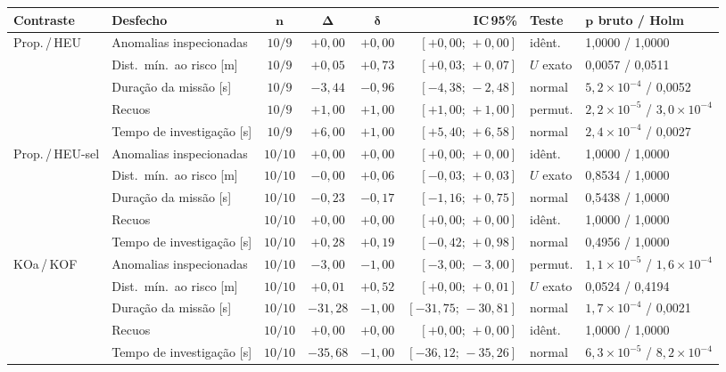 \begin{tabular}{llcccrll}
\hline
\textbf{Contraste} & \textbf{Desfecho} & $\bm{n}$ & $\bm{\Delta}$ & $\bm{\delta}$ & \textbf{IC\,95\%} & \textbf{Teste} & $\bm{p}$ \textbf{bruto / Holm}\\
\hline
Prop.\,/\,HEU & Anomalias inspecionadas & $10/9$ & $+0{,}00$ & $+0{,}00$ & $[+0{,}00;\,+0{,}00]$ & idênt. & 1{,}0000 / 1{,}0000\\
 & Dist.\ mín.\ ao risco [m] & $10/9$ & $+0{,}05$ & $+0{,}73$ & $[+0{,}03;\,+0{,}07]$ & $U$ exato & 0{,}0057 / 0{,}0511\\
 & Duração da missão [s] & $10/9$ & $-3{,}44$ & $-0{,}96$ & $[-4{,}38;\,-2{,}48]$ & normal & $5{,}2\times10^{-4}$ / 0{,}0052\\
 & Recuos & $10/9$ & $+1{,}00$ & $+1{,}00$ & $[+1{,}00;\,+1{,}00]$ & permut. & $2{,}2\times10^{-5}$ / $3{,}0\times10^{-4}$\\
 & Tempo de investigação [s] & $10/9$ & $+6{,}00$ & $+1{,}00$ & $[+5{,}40;\,+6{,}58]$ & normal & $2{,}4\times10^{-4}$ / 0{,}0027\\
\hline
Prop.\,/\,HEU-sel & Anomalias inspecionadas & $10/10$ & $+0{,}00$ & $+0{,}00$ & $[+0{,}00;\,+0{,}00]$ & idênt. & 1{,}0000 / 1{,}0000\\
 & Dist.\ mín.\ ao risco [m] & $10/10$ & $-0{,}00$ & $+0{,}06$ & $[-0{,}03;\,+0{,}03]$ & $U$ exato & 0{,}8534 / 1{,}0000\\
 & Duração da missão [s] & $10/10$ & $-0{,}23$ & $-0{,}17$ & $[-1{,}16;\,+0{,}75]$ & normal & 0{,}5438 / 1{,}0000\\
 & Recuos & $10/10$ & $+0{,}00$ & $+0{,}00$ & $[+0{,}00;\,+0{,}00]$ & idênt. & 1{,}0000 / 1{,}0000\\
 & Tempo de investigação [s] & $10/10$ & $+0{,}28$ & $+0{,}19$ & $[-0{,}42;\,+0{,}98]$ & normal & 0{,}4956 / 1{,}0000\\
\hline
KOa\,/\,KOF & Anomalias inspecionadas & $10/10$ & $-3{,}00$ & $-1{,}00$ & $[-3{,}00;\,-3{,}00]$ & permut. & $1{,}1\times10^{-5}$ / $1{,}6\times10^{-4}$\\
 & Dist.\ mín.\ ao risco [m] & $10/10$ & $+0{,}01$ & $+0{,}52$ & $[+0{,}00;\,+0{,}01]$ & $U$ exato & 0{,}0524 / 0{,}4194\\
 & Duração da missão [s] & $10/10$ & $-31{,}28$ & $-1{,}00$ & $[-31{,}75;\,-30{,}81]$ & normal & $1{,}7\times10^{-4}$ / 0{,}0021\\
 & Recuos & $10/10$ & $+0{,}00$ & $+0{,}00$ & $[+0{,}00;\,+0{,}00]$ & idênt. & 1{,}0000 / 1{,}0000\\
 & Tempo de investigação [s] & $10/10$ & $-35{,}68$ & $-1{,}00$ & $[-36{,}12;\,-35{,}26]$ & normal & $6{,}3\times10^{-5}$ / $8{,}2\times10^{-4}$\\
\hline
\end{tabular}
